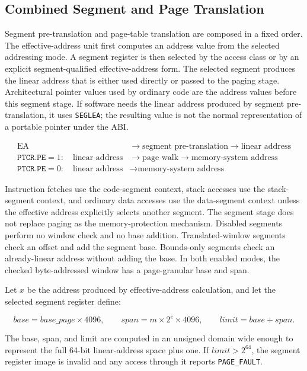 \subsection{Combined Segment and Page Translation}
Segment pre-translation and page-table translation are composed in a fixed order.
The effective-address unit first computes an address value from the selected addressing
mode. A segment register is then selected by the access class or by an explicit
segment-qualified effective-address form. The selected segment produces the linear
address that is either used directly or passed to the paging stage.
Architectural pointer values used by ordinary code are the address values before this
segment stage. If software needs the linear address produced by segment pre-translation,
it uses \texttt{SEGLEA}; the resulting value is not the normal representation of a
portable pointer under the ABI.

\[
\begin{aligned}
\mathrm{EA} &\rightarrow \text{segment pre-translation} \rightarrow \text{linear address}\\
\texttt{PTCR.PE}=1:\quad \text{linear address} &\rightarrow \text{page walk} \rightarrow \text{memory-system address}\\
\texttt{PTCR.PE}=0:\quad \text{linear address} &\rightarrow \text{memory-system address}
\end{aligned}
\]

Instruction fetches use the code-segment context, stack accesses use the stack-segment
context, and ordinary data accesses use the data-segment context unless the effective
address explicitly selects another segment. The segment stage does not replace paging
as the memory-protection mechanism. Disabled segments perform no window check and no
base addition. Translated-window segments check an offset and add the segment base.
Bounds-only segments check an already-linear address without adding the base. In both
enabled modes, the checked byte-addressed window has a page-granular base and span.

Let \(x\) be the address produced by effective-address calculation, and let the selected
segment register define:

\[
\mathit{base} = \mathit{base\_page} \times 4096,\qquad
\mathit{span} = m \times 2^e \times 4096,\qquad
\mathit{limit} = \mathit{base} + \mathit{span}.
\]

The base, span, and limit are computed in an unsigned domain wide enough to represent
the full 64-bit linear-address space plus one. If \(\mathit{limit} > 2^{64}\), the
segment register image is invalid and any access through it reports \texttt{PAGE\_FAULT}.

